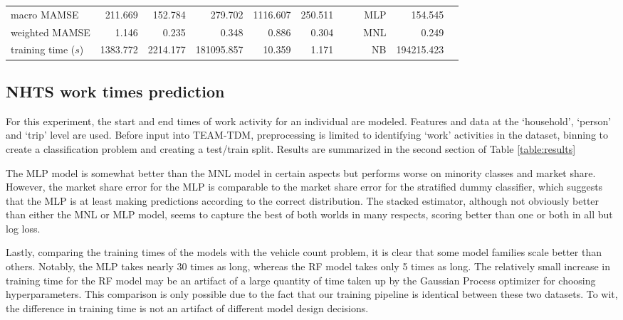 \documentclass[numbered]{trbunofficial}
\begin{document}
{\begin{landscape}
\begin{table}[t]
\begin{center}
\begin{tabular}{l|rrrrrrr|r|r|r}
macro MAMSE                       &        211.669 &              152.784 &                                        279.702 &     1116.607 &           250.511 &&&   MLP&     154.545& \\
weighted MAMSE                    &          1.146 &                0.235 &                                          0.348 &        0.886 &             0.304 &&&  MNL&        0.249& \\
training time ($s$)                        &       1383.772 &             2214.177 &                181095.857 &       10.359 &             1.171 &&& NB&    194215.423& \\
\hline

\end{tabular}

\end{center}
\end{table}

    \end{landscape}
    \clearpage%
}
\newpage

\subsection{NHTS work times prediction}\label{subsection:work}

For this experiment, the start and end times of work activity for an individual are modeled.
 Features and data at the `household', `person' and `trip' level are used.
 Before input into TEAM-TDM, preprocessing is limited to identifying `work' activities in the dataset, binning to create a classification problem and creating a test/train split.
 Results are summarized in the second section of Table \ref{table:results}

The MLP model is somewhat better than the MNL model in certain aspects but performs worse on minority classes and market share.
 However, the market share error for the MLP is comparable to the market share error for the stratified dummy classifier, which suggests that the MLP is at least making predictions according to the correct distribution. 
 The stacked estimator, although not obviously better than either the MNL or MLP model, seems to capture the best of both worlds in many respects, scoring better than one or both in all but log loss.

Lastly, comparing the training times of the models with the vehicle count problem, it is clear that some model families scale better than others.
 Notably, the MLP takes nearly 30 times as long, whereas the RF model takes only 5 times as long.
 The relatively small increase in training time for the RF model may be an artifact of a large quantity of time taken up by the Gaussian Process optimizer for choosing hyperparameters.
 This comparison is only possible due to the fact that our training pipeline is identical between these two datasets.
 To wit, the difference in training time is not an artifact of different model design decisions.
\end{document}
